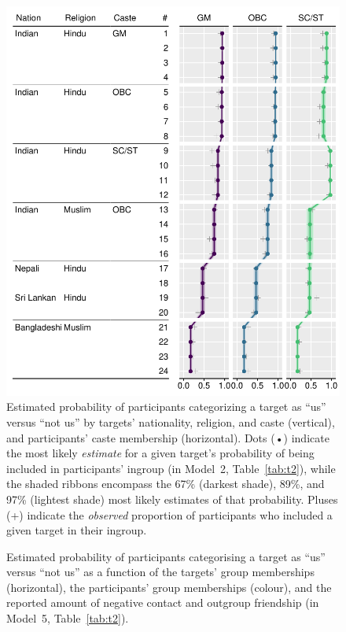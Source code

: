 \documentclass[12pt,a4paper]{article}
\begin{document}
\begin{figure}
\centering
\includegraphics[scale=1]{../figures/figure-2}
\caption{
Estimated probability of participants categorizing a target as ``us'' versus ``not us'' by targets' nationality, religion, and caste (vertical), and participants' caste membership (horizontal). Dots (•) indicate the most likely \emph{estimate} for a given target's probability of being included in participants' ingroup (in Model~2, Table~\ref{tab:t2}), while the shaded ribbons encompass the 67\% (darkest shade), 89\%, and 97\% (lightest shade) most likely estimates of that probability. Pluses (+) indicate the \emph{observed} proportion of participants who included a given target in their ingroup. %
}
\label{fig:f2}
\end{figure}

\begin{figure}
\centering
\caption{Estimated probability of participants categorising a target as ``us'' versus ``not us'' as a function of the targets' group memberships (horizontal), the participants' group memberships (colour), and the reported amount of negative contact and outgroup friendship (in Model~5, Table~\ref{tab:t2}).}
\label{fig:f3}
\end{figure}
\end{document}
